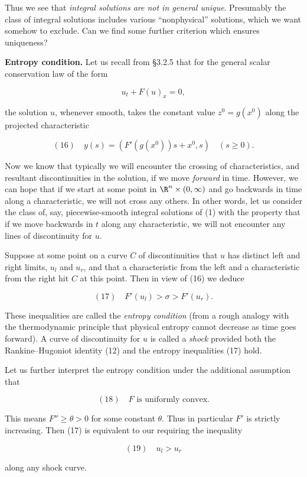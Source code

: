 Thus we see that \textit{integral solutions are not in general unique}. Presumably the class of integral solutions includes various ``nonphysical'' solutions, which we want somehow to exclude. Can we find some further criterion which ensures uniqueness?

\textbf{Entropy condition.} Let us recall from \S 3.2.5 that for the general scalar conservation law of the form

$$u_t + F(u)_x = 0,$$

the solution $u$, whenever smooth, takes the constant value $z^0 = g(x^0)$ along the projected characteristic

$$(16) \quad y(s) = (F'(g(x^0))s + x^0, s) \quad (s \geq 0).$$

Now we know that typically we will encounter the crossing of characteristics, and resultant discontinuities in the solution, if we move \textit{forward} in time. However, we can hope that if we start at some point in $\R^n \times (0, \infty)$ and go backwards in time along a characteristic, we will not cross any others. In other words, let us consider the class of, say, piecewise-smooth integral solutions of (1) with the property that if we move backwards in $t$ along any characteristic, we will not encounter any lines of discontinuity for $u$.

\begin{definition}
\label{def:shock-entropy-condition}
Suppose at some point on a curve $C$ of discontinuities that $u$ has distinct left and right limits, $u_l$ and $u_r$, and that a characteristic from the left and a characteristic from the right hit $C$ at this point. Then in view of (16) we deduce

$$(17) \quad F'(u_l) > \sigma > F'(u_r).$$

These inequalities are called the \textit{entropy condition} (from a rough analogy with the thermodynamic principle that physical entropy cannot decrease as time goes forward). A curve of discontinuity for $u$ is called a \textit{shock} provided both the Rankine--Hugoniot identity (12) and the entropy inequalities (17) hold.
\end{definition}

\begin{remark}
\label{rem:entropy-condition-uniform-convexity}
Let us further interpret the entropy condition under the additional assumption that

$$(18) \quad F \text{ is uniformly convex.}$$

This means $F'' \geq \theta > 0$ for some constant $\theta$. Thus in particular $F'$ is strictly increasing. Then (17) is equivalent to our requiring the inequality

$$(19) \quad u_l > u_r$$

along any shock curve.
\end{remark}

